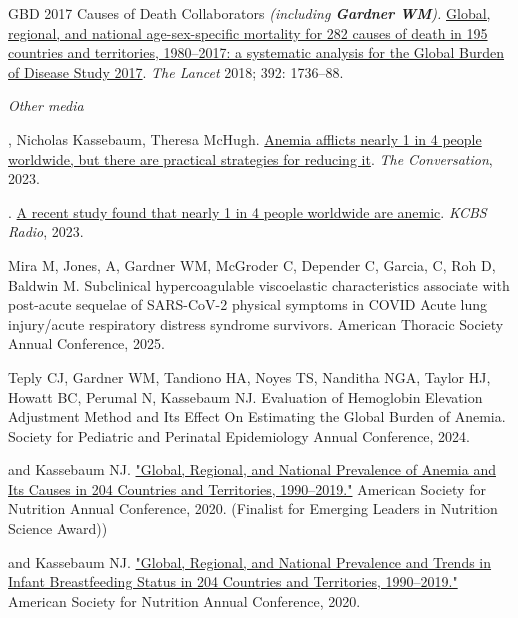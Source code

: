 \documentclass[11pt,article,oneside]{memoir}
\begin{document}
\ind GBD 2017 Causes of Death Collaborators \emph{(including \textbf{Gardner WM}).} \href{https://doi.org/10.1016/S0140-6736(18)32203-7}{Global, regional, and national age-sex-specific
mortality for 282 causes of death in 195 countries and territories, 1980--2017: a systematic analysis for the
Global Burden of Disease Study 2017}. \emph{The Lancet} 2018; 392: 1736--88.

\bigskip 
\noindent\emph{Other media \vspace{0.05in}}

, Nicholas Kassebaum, Theresa McHugh. \href{https://theconversation.com/anemia-afflicts-nearly-1-in-4-people-worldwide-but-there-are-practical-strategies-for-reducing-it-212177}{ 
Anemia afflicts nearly 1 in 4 people worldwide, but there are practical strategies for reducing it}. \emph{The Conversation}, 2023.

. \href{https://omny.fm/shows/kcbsam-on-demand/a-recent-study-found-that-nearly-1-in-four-people}{
	A recent study found that nearly 1 in 4 people worldwide are anemic}. \emph{KCBS Radio}, 2023.

\bigskip

\medskip

\ind Mira M, Jones, A, {\minbold Gardner WM}, McGroder C, Depender C, Garcia, C, Roh D, Baldwin M. Subclinical hypercoagulable viscoelastic characteristics associate with 
post-acute sequelae of SARS-CoV-2 physical symptoms in COVID Acute lung injury/acute respiratory distress syndrome survivors. American Thoracic Society Annual Conference, 2025. 

\ind Teply CJ, {\minbold Gardner WM}, Tandiono HA, Noyes TS, Nanditha NGA, Taylor HJ, Howatt BC, Perumal N, Kassebaum NJ. Evaluation of Hemoglobin Elevation Adjustment Method and 
Its Effect On Estimating the Global Burden of Anemia. Society for Pediatric and Perinatal Epidemiology Annual Conference, 2024. 

 and Kassebaum NJ. \href{https://doi.org/10.1093/cdn/nzaa053_035}{"Global, Regional, and National Prevalence of Anemia and Its
Causes in 204 Countries and Territories, 1990--2019."} American Society for Nutrition Annual Conference, 2020. (Finalist for Emerging 
Leaders in Nutrition Science Award))

 and Kassebaum NJ. \href{https://doi.org/10.1093/cdn/nzaa054_064}{"Global, Regional, and National Prevalence and Trends in Infant Breastfeeding Status in 204 Countries and Territories, 1990--2019."} 
American Society for Nutrition Annual Conference, 2020.
\end{document}
